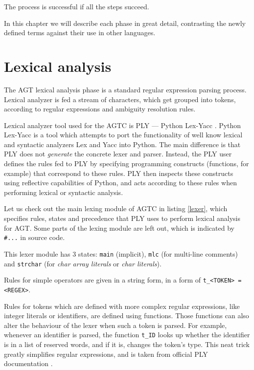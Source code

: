\documentclass[times, utf8, diplomski]{fer}
\theoremstyle{definition}
\newcommand{\pythoncode}[3]{
    
}
\begin{document}
The process is successful if all the steps succeed.

In this chapter we will describe each phase in great detail, contrasting the
newly defined terms against their use in other languages.

\section{Lexical analysis}

The AGT lexical analysis phase is a standard regular expression parsing process.
Lexical analyzer is fed a stream of characters, which get grouped into tokens,
according to regular expressions and ambiguity resolution rules.

Lexical analyzer tool used for the AGTC is PLY --- Python Lex-Yacc \citep{c_ply_beazley}.
Python Lex-Yacc is a tool which attempts to port the functionality of well know
lexical and syntactic analyzers Lex and Yacc into Python. The main difference
is that PLY does not \textit{generate} the 
concrete lexer and parser. Instead, the PLY user defines the rules fed to PLY by
specifying programming 
constructs (functions, for example) that correspond to these rules. 
PLY then inspects these constructs using 
reflective capabilities of Python, and acts according to these rules
when performing lexical or syntactic analysis.

Let us check out the main lexing module of AGTC in listing \ref{lexer}, 
which specifies rules, states and precedence that
PLY uses to perform lexical analysis for AGT. Some parts of the lexing module
are left out, which is indicated by \texttt{\#...} in source code.

\pythoncode{\resdir/compiler/lexer.py}{lexer}{Lexing module}

This lexer module has 3 states: \texttt{main} (implicit), \texttt{mlc} (for multi-line comments) 
and \texttt{strchar} (for \textit{char array literals} or \textit{char literals}).

Rules for simple operators are given in a string form, 
in a form of \texttt{t\_<TOKEN> = <REGEX>}.

Rules for tokens which are defined with more complex regular expressions, 
like integer literals or identifiers, are defined using functions. 
Those functions can also alter the behaviour of the
lexer when such a token is parsed. For example, whenever an identifier is parsed,
the function \texttt{t\_ID} looks up whether the identifier is in a list of reserved
words, and if it is, changes the token's type. This neat trick greatly simplifies
regular expressions, and is taken from official PLY documentation \citep{c_ply_docs_beazley}.
\end{document}
